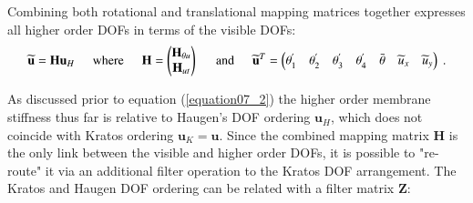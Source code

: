 Combining both rotational and translational mapping matrices together expresses all higher order DOFs in terms of the visible DOFs:
\begin{equation} 
\widetilde{\mathbf{u}} = \mathbf{H} \mathbf{u}_H
\hspace{5mm}
\text{where}
\hspace{5mm}
\mathbf{H} =
\begin{pmatrix}
\mathbf{H}_{\theta u} \\
\mathbf{H}_{ut}
\end{pmatrix}
\hspace{5mm}
\text{and}
\hspace{5mm}
\widetilde{\mathbf{u}}^T = 
\begin{pmatrix}
\theta_1^{'} & \theta_2^{'} & \theta_3^{'} & \theta_4^{'} & \bar{\theta} &  \widetilde{u}_x & \widetilde{u}_y
\end{pmatrix}
\label{equation11}\ .
\end{equation}

As discussed prior to equation (\ref{equation07_2}) the higher order membrane stiffness thus far is relative to Haugen's DOF ordering $\mathbf{u}_H$, which does not coincide with Kratos ordering $\mathbf{u}_K = \mathbf{u}$. Since the combined mapping matrix $\mathbf{H}$ is the only link between the visible and higher order DOFs, it is possible to "re-route" it via an additional filter operation to the Kratos DOF arrangement. The Kratos and Haugen DOF ordering can be related with a filter matrix $\mathbf{Z}$:

